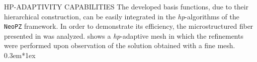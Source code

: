 \documentclass[debug]{beamer} %
\def\vspace{0.3em}{ }%
\begin{document}
\begin{frame}
    \begin{minipage}[t]{0.45\textwidth}
        \begin{block}{\boxnumber HP-ADAPTIVITY CAPABILITIES }
        The developed basis functions, due to their hierarchical construction, can be easily integrated in the \emph{hp}-algorithms of the \texttt{NeoPZ} framework\parencite{diazcalle15}. In order to demonstrate its efficiency, the microstructured fiber presented in \parencite{chiang11} was analyzed.  shows a \emph{hp}-adaptive mesh in which the refinements were performed upon observation of the solution obtained with a fine mesh.
        \vspace*{1ex}

	        \begin{figure}
	        	\centering
\end{figure}
\end{block}
\end{minipage}
\end{frame}
\end{document}
